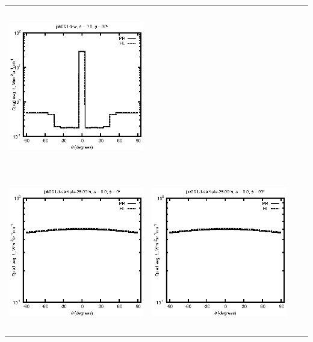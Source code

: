 \documentclass[10pt,a4paper]{article}
\begin{document}
\begin{adjustwidth}{-1.2in}{-1.2in}
\begin{tabular}{c c c c}
\includegraphics[height=7cm]{../eps/jok00_Ld_w_cross.eps} \\
\includegraphics[height=7cm]{../eps/jok00_Ld_sample_25.00m_fwd.eps} &
\includegraphics[height=7cm]{../eps/jok00_Ld_sample_25.00m_cross.eps} \\
\end{tabular}

\pagebreak


\end{adjustwidth}
\end{document}
